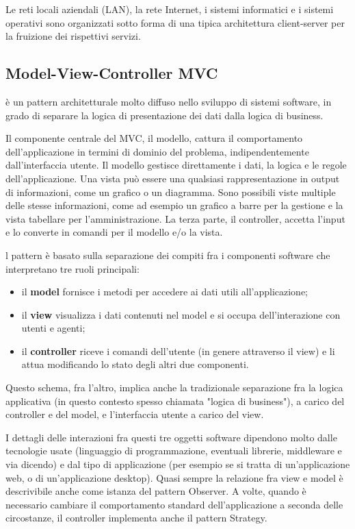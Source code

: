 Le reti locali aziendali (LAN), la rete Internet, i sistemi informatici e i sistemi operativi sono organizzati sotto forma di una tipica architettura client-server per la fruizione dei rispettivi servizi.

\subsection{Model-View-Controller MVC}
è un pattern architetturale molto diffuso nello sviluppo di sistemi software, in grado di separare la logica di presentazione dei dati dalla logica di business.

Il componente centrale del MVC, il modello, cattura il comportamento dell'applicazione in termini di dominio del problema, indipendentemente dall'interfaccia utente. Il modello gestisce direttamente i dati, la logica e le regole dell'applicazione. Una vista può essere una qualsiasi rappresentazione in output di informazioni, come un grafico o un diagramma. Sono possibili viste multiple delle stesse informazioni, come ad esempio un grafico a barre per la gestione e la vista tabellare per l'amministrazione. La terza parte, il controller, accetta l'input e lo converte in comandi per il modello e/o la vista.

l pattern è basato sulla separazione dei compiti fra i componenti software che interpretano tre ruoli principali:
\begin{itemize}
\item il \textbf{model} fornisce i metodi per accedere ai dati utili all'applicazione;
\item il \textbf{view} visualizza i dati contenuti nel model e si occupa dell'interazione con utenti e agenti;
\item il \textbf{controller} riceve i comandi dell'utente (in genere attraverso il view) e li attua modificando lo stato degli altri due componenti.
\end{itemize}
Questo schema, fra l'altro, implica anche la tradizionale separazione fra la logica applicativa (in questo contesto spesso chiamata "logica di business"), a carico del controller e del model, e l'interfaccia utente a carico del view.

I dettagli delle interazioni fra questi tre oggetti software dipendono molto dalle tecnologie usate (linguaggio di programmazione, eventuali librerie, middleware e via dicendo) e dal tipo di applicazione (per esempio se si tratta di un'applicazione web, o di un'applicazione desktop). Quasi sempre la relazione fra view e model è descrivibile anche come istanza del pattern Observer. A volte, quando è necessario cambiare il comportamento standard dell'applicazione a seconda delle circostanze, il controller implementa anche il pattern Strategy.

